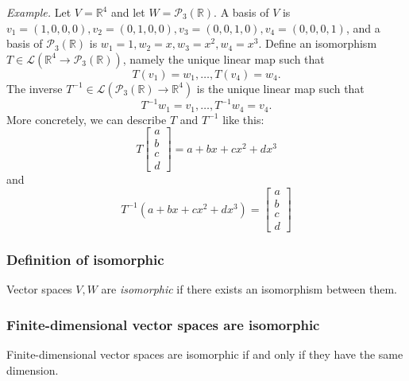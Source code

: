 \documentclass[11pt]{article}
\begin{document}
    \emph{Example.} Let \(V = \mathbb{R}^4\) and let \(W = \mathcal{P}_3 (\mathbb{R})\). A basis of $V$ is \(v_1 = (1,0,0,0), v_2 = (0,1,0,0), v_3 = (0,0,1,0), v_4 = (0,0,0,1)\), and a basis of \(\mathcal{P}_3 (\mathbb{R})\) is \(w_1 = 1, w_2 = x, w_3 = x^2, w_4 = x^3\). Define an isomorphism \(T \in \mathcal{L}(\mathbb{R}^4 \rightarrow \mathcal{P}_3 (\mathbb{R}))\), namely the unique linear map such that \[T(v_1) = w_1, \dots, T(v_4) = w_4.\] The inverse \(T^{-1} \in \mathcal{L}(\mathcal{P}_3 (\mathbb{R}) \rightarrow \mathbb{R}^4)\) is the unique linear map such that \[T^{-1} w_1 = v_1, \dots, T^{-1} w_4 = v_4.\] More concretely, we can describe $T$ and $T^{-1}$ like this:
    \begin{equation*}
        T \begin{bmatrix}
            a \\
            b \\
            c \\
            d  
          \end{bmatrix} = a + bx + cx^2 + dx^3
    \end{equation*}
    and
    \begin{equation*}
        T^{-1} (a + bx + cx^2 + dx^3) = \begin{bmatrix}
                                            a \\
                                            b \\
                                            c \\
                                            d
                                        \end{bmatrix}
    \end{equation*}

    \subsubsection{Definition of isomorphic}
    Vector spaces $V,W$ are \emph{isomorphic} if there exists an isomorphism between them.

    \subsubsection{Finite-dimensional vector spaces are isomorphic}
    
    Finite-dimensional vector spaces are isomorphic if and only if they have the same dimension. 
\end{document}
